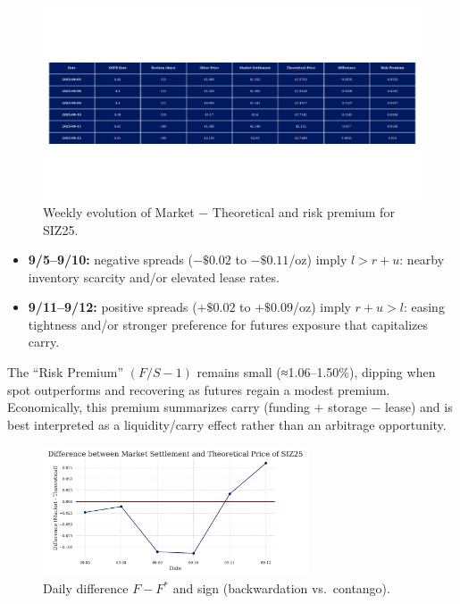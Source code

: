 \documentclass[11pt,a4paper]{article} %
\begin{document}
\begin{figure}[h]
\centering
\includegraphics[width=\textwidth]{figures/silver_pricing_over_the_week.pdf}
\caption{Weekly evolution of Market \(-\) Theoretical and risk premium for SIZ25.}
\label{fig:silver_week}
\end{figure}

\begin{itemize}
  \item \textbf{9/5–9/10:} negative spreads (\(-\$0.02\) to \(-\$0.11\)/oz) imply \(l>r+u\): nearby inventory scarcity and/or elevated lease rates.
  \item \textbf{9/11–9/12:} positive spreads (\(+\$0.02\) to \(+\$0.09\)/oz) imply \(r+u>l\): easing tightness and/or stronger preference for futures exposure that capitalizes carry.
\end{itemize}
The “Risk Premium” \((F/S-1)\) remains small (≈1.06–1.50\%), dipping when spot outperforms and recovering as futures regain a modest premium. Economically, this premium summarizes carry (funding \(+\) storage \(-\) lease) and is best interpreted as a liquidity/carry effect rather than an arbitrage opportunity.

\begin{figure}[h]
\centering
\includegraphics[width=0.7\textwidth]{figures/silver_difference.pdf}
\caption{Daily difference \(F-F^{*}\) and sign (backwardation vs.\ contango).}
\label{fig:silver_difference}
\end{figure}
\end{document}

